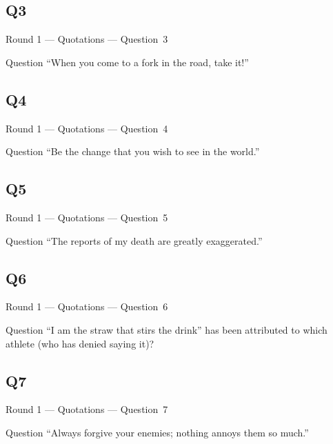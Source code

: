 \documentclass[11pt]{beamer}
\begin{document}
\subsection*{Q3}
\begin{frame}[t]{Round 1 --- Quotations --- \mbox{Question 3}}
\vspace{-0.5em}
\begin{block}{Question}
``When you come to a fork in the road, take it!''
\end{block}
\end{frame}
\subsection*{Q4}
\begin{frame}[t]{Round 1 --- Quotations --- \mbox{Question 4}}
\vspace{-0.5em}
\begin{block}{Question}
``Be the change that you wish to see in the world.''
\end{block}
\end{frame}
\subsection*{Q5}
\begin{frame}[t]{Round 1 --- Quotations --- \mbox{Question 5}}
\vspace{-0.5em}
\begin{block}{Question}
``The reports of my death are greatly exaggerated.''
\end{block}
\end{frame}
\subsection*{Q6}
\begin{frame}[t]{Round 1 --- Quotations --- \mbox{Question 6}}
\vspace{-0.5em}
\begin{block}{Question}
``I am the straw that stirs the drink'' has been attributed to which athlete (who has denied saying it)?
\end{block}
\end{frame}
\subsection*{Q7}
\begin{frame}[t]{Round 1 --- Quotations --- \mbox{Question 7}}
\vspace{-0.5em}
\begin{block}{Question}
``Always forgive your enemies; nothing annoys them so much.''
\end{block}
\end{frame}
\end{document}
